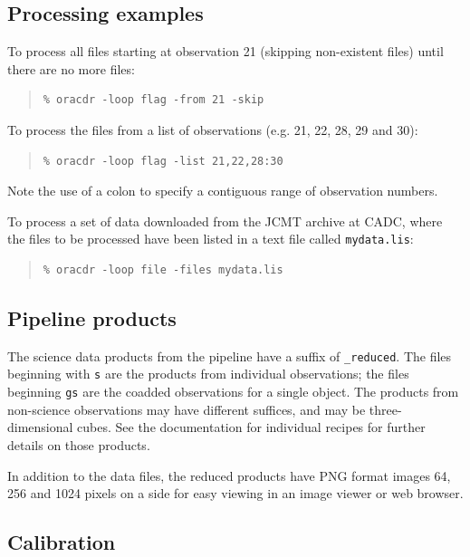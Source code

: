 \documentclass[twoside,11pt]{article}
\renewcommand{\_}{\texttt{\symbol{95}}}
\newenvironment{myquote}{\begin{quote}\begin{small}}{\end{small}\end{quote}}
\begin{document}
\subsection{Processing examples}

To process all files starting at observation 21 (skipping non-existent
files) until there are no more files:
\begin{myquote}
\begin{verbatim}
% oracdr -loop flag -from 21 -skip
\end{verbatim}
\end{myquote}

To process the files from a list of observations (e.g. 21, 22, 28, 29 and
30):
\begin{myquote}
\begin{verbatim}
% oracdr -loop flag -list 21,22,28:30
\end{verbatim}
\end{myquote}
Note the use of a colon to specify a contiguous range of observation
numbers.

To process a set of data downloaded from the JCMT archive at CADC,
where the files to be processed have been listed in a text file called
\verb+mydata.lis+:
\begin{myquote}
\begin{verbatim}
% oracdr -loop file -files mydata.lis
\end{verbatim}
\end{myquote}

\subsection{Pipeline products}

The science data products from the pipeline have a suffix of
\verb+_reduced+. The files beginning with \verb+s+ are the products from
individual observations; the files beginning \verb+gs+ are the coadded
observations for a single object. The products from non-science
observations may have different suffices, and may be three-dimensional
cubes. See the documentation for individual recipes for further
details on those products.

In addition to the data files, the reduced products have PNG format
images 64, 256 and 1024 pixels on a side for easy viewing in an image
viewer or web browser.

\subsection{Calibration}
\end{document}
